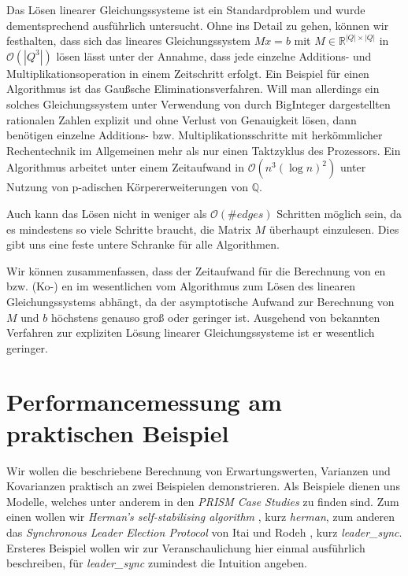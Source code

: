 \documentclass[a4paper]{article}
\theoremstyle{nonumberplain}
\begin{document}
Das Lösen linearer Gleichungssysteme ist ein Standardproblem und wurde dementsprechend ausführlich untersucht. Ohne ins Detail zu gehen, können wir festhalten, dass sich das lineares Gleichungssystem $Mx = b$ mit $M \in \mathbb{R}^{|Q|\times|Q|}$  in $\mathcal{O}(|Q^3|)$ lösen lässt unter der Annahme, dass jede einzelne Additions- und Multiplikationsoperation in einem Zeitschritt erfolgt. Ein Beispiel für einen Algorithmus ist das Gaußsche Eliminationsverfahren. Will man allerdings ein solches Gleichungssystem unter Verwendung von durch BigInteger dargestellten rationalen Zahlen explizit und ohne Verlust von Genauigkeit lösen, dann benötigen einzelne Additions- bzw. Multiplikationsschritte mit herkömmlicher Rechentechnik im Allgemeinen mehr als nur einen Taktzyklus des Prozessors. Ein Algorithmus \cite{Dixon1982} arbeitet unter einem Zeitaufwand in $\mathcal{O}(n^3(\log n)^2)$ unter Nutzung von p-adischen Körper\-er\-wei\-ter\-ung\-en von $\mathbb{Q}$.

Auch kann das Lösen nicht in weniger als $\mathcal{O}(\#edges)$ Schritten möglich sein, da es mindestens so viele Schritte braucht, die Matrix $M$ überhaupt einzulesen. Dies gibt uns eine feste untere Schranke für alle Algorithmen. 

Wir können zusammenfassen, dass der Zeitaufwand für die Berechnung von \expect{}en bzw. (Ko-) \var{}en im wesentlichen vom Algorithmus zum Lösen des linearen Gleichungssystems abhängt, da der asymptotische Aufwand zur Berechnung von $M$ und $b$ höchstens genauso groß oder geringer ist. Ausgehend von bekannten Verfahren zur expliziten Lösung linearer Gleichungssysteme ist er wesentlich geringer.


\section{Performancemessung am praktischen Beispiel}

Wir wollen die beschriebene Berechnung von Erwartungswerten, Varianzen und Kovarianzen praktisch an zwei Beispielen demonstrieren. Als Beispiele dienen uns Modelle, welches unter anderem in den \textit{PRISM Case Studies} \cite{PRISMCS} zu finden sind. Zum einen wollen wir \textit{Herman's self-stabilising algorithm} \cite{Her90}, kurz \textit{herman}, zum anderen das \textit{Synchronous Leader Election Protocol} von Itai und Rodeh \cite{IR90}, kurz \textit{leader\_sync}. Ersteres Beispiel wollen wir zur Veranschaulichung hier einmal ausführlich beschreiben, für \textit{leader\_sync} zumindest die Intuition angeben.
\end{document}
